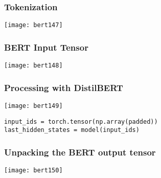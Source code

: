 \begin{frame}[fragile]\frametitle{Tokenization}


			\begin{center}
			\texttt{[image: bert147]}
			\end{center}	


\end{frame}

\begin{frame}[fragile]\frametitle{BERT Input Tensor}

			\begin{center}
			\texttt{[image: bert148]}
			\end{center}	


\end{frame}

\begin{frame}[fragile]\frametitle{Processing with DistilBERT}



			\begin{center}
			\texttt{[image: bert149]}
			\end{center}	

\begin{lstlisting}
input_ids = torch.tensor(np.array(padded))
last_hidden_states = model(input_ids)
\end{lstlisting}



\end{frame}

\begin{frame}[fragile]\frametitle{Unpacking the BERT output tensor}

			\begin{center}
			\texttt{[image: bert150]}
			\end{center}	


\end{frame}

